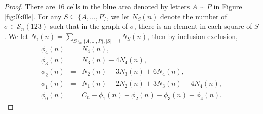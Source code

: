 \documentclass[
final,nomarks
]{dmtcs-episciences}
\newcommand{\fref}[1]{Figure \ref{fig:#1}}
\newcommand{\Sn}[1]{\mathcal{S}_{#1}}
\begin{document}
\begin{proof}
	There are \begin{math}16\end{math} cells in the blue area denoted by letters \begin{math}A\sim P\end{math} in \fref{0k0le}. 
	For any \begin{math}S \subseteq \{A, \ldots, P\}\end{math}, we let \begin{math}N_S(n)\end{math} denote the number of 
	\begin{math}\sigma \in \Sn{n}(123)\end{math} such that in the graph of \begin{math}\sigma\end{math}, there is an element in each square of \begin{math}S\end{math}. 
	We let \begin{math}N_i(n)=\sum_{S \subseteq \{A, \ldots,P\},|S|=i}N_{S}(n)\end{math}, then by inclusion-exclusion,
	\begin{eqnarray}
		\phi_4(n)&=&N_4(n),\\
		\phi_3(n)&=&N_3(n)-4N_4(n),\\
		\phi_2(n)&=&N_2(n)-3N_3(n)+6N_4(n),\\
		\phi_1(n)&=&N_1(n)-2N_2(n)+3N_3(n)-4N_4(n),\\
		\phi_0(n)&=&C_n-\phi_1(n)-\phi_2(n)-\phi_3(n)-\phi_4(n).
	\end{eqnarray}

\end{proof}
\end{document}
